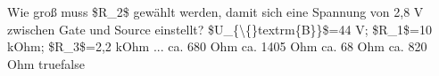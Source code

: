     {Wie groß muss \$R\_2\$ gewählt werden, damit sich eine Spannung von 2,8 V zwischen Gate und Source einstellt? \$U\_\{\textbackslash\{\}textrm\{B\}\}\$=44 V; \$R\_1\$=10 kOhm; \$R\_3\$=2,2 kOhm ...}
    {ca. 680 Ohm}
    {ca. 1405 Ohm}
    {ca. 68 Ohm}
    {ca. 820 Ohm}
    {true}{false}